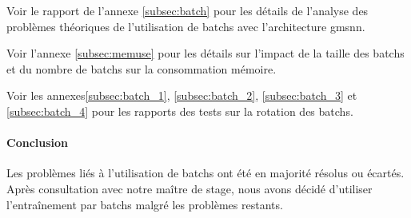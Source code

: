 Voir le rapport de l'annexe \ref{subsec:batch} pour les détails de l'analyse des problèmes théoriques de l'utilisation de \glspl{batch} avec l'architecture \gls{gmsnn}.

Voir l'annexe \ref{subsec:memuse} pour les détails sur l'impact de la taille des \glspl{batch} et du nombre de \glspl{batch} sur la consommation mémoire.

Voir les annexes\ref{subsec:batch_1}, \ref{subsec:batch_2}, \ref{subsec:batch_3} et \ref{subsec:batch_4} pour les rapports des tests sur la rotation des \glspl{batch}.

\paragraph{Conclusion}
Les problèmes liés à l'utilisation de \glspl{batch} ont été en majorité résolus ou écartés. Après consultation avec notre maître de stage, nous avons décidé d'utiliser l'entraînement par \glspl{batch} malgré les problèmes restants.